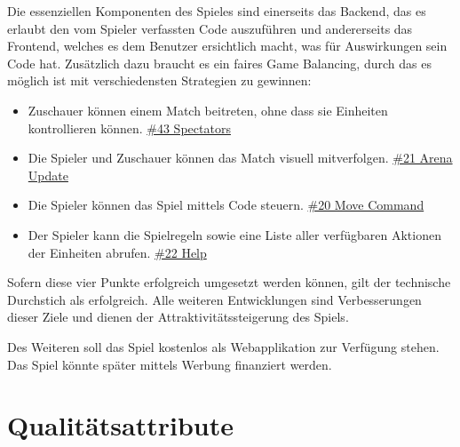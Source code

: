 \documentclass[11pt,a4paper,german]{scrartcl}
\let\oldsection\section
\renewcommand\section{\clearpage\oldsection}
\begin{document}
Die essenziellen Komponenten des Spieles sind einerseits das Backend, das es erlaubt den vom Spieler verfassten Code auszuführen und andererseits das Frontend, welches es dem Benutzer ersichtlich macht, was für Auswirkungen sein Code hat. Zusätzlich dazu braucht es ein faires Game Balancing, durch das es möglich ist mit verschiedensten Strategien zu gewinnen:

\begin{itemize}
  \item Zuschauer können einem Match beitreten, ohne dass sie Einheiten kontrollieren können. \href{https://dev.azure.com/schaumic/darwin/_workitems/edit/43/}{\#43 Spectators}
  \item Die Spieler und Zuschauer können das Match visuell mitverfolgen. \href{https://dev.azure.com/schaumic/darwin/_workitems/edit/21/}{\#21 Arena Update}
  \item Die Spieler können das Spiel mittels Code steuern. \href{https://dev.azure.com/schaumic/darwin/_workitems/edit/20/}{\#20 Move Command}
  \item Der Spieler kann die Spielregeln sowie eine Liste aller verfügbaren Aktionen der Einheiten abrufen. \href{https://dev.azure.com/schaumic/darwin/_workitems/edit/22/}{\#22 Help}
\end{itemize}

Sofern diese vier Punkte erfolgreich umgesetzt werden können, gilt der technische Durchstich als erfolgreich. Alle weiteren Entwicklungen sind Verbesserungen dieser Ziele und dienen der Attraktivitätssteigerung des Spiels.

Des Weiteren soll das Spiel kostenlos als Webapplikation zur Verfügung stehen. Das Spiel könnte später mittels Werbung finanziert werden.

\section{Qualitätsattribute}
\end{document}
